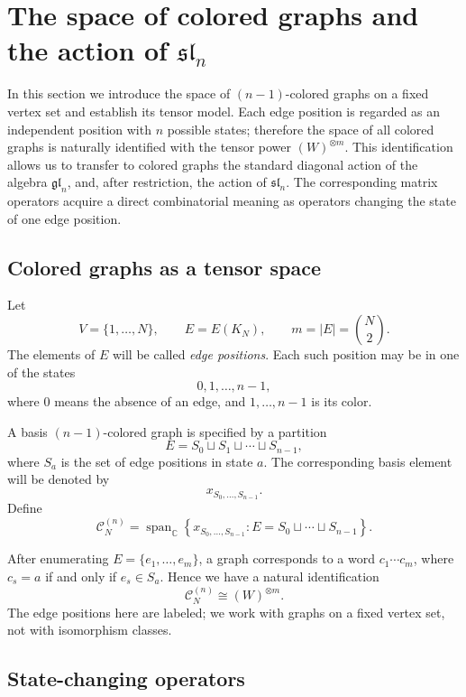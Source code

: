 \documentclass[12pt,reqno]{amsart}
\newcommand{\Span}{\operatorname{span}}
\begin{document}
\section{The space of colored graphs and the action of $\mathfrak{sl}_n$}
\label{colored_graphs}

In this section we introduce the space of $(n-1)$-colored graphs on a
fixed vertex set and establish its tensor model. Each edge position is
regarded as an independent position with $n$ possible states; therefore
the space of all colored graphs is naturally identified with the tensor
power $(W)^{\otimes m}$. This identification allows us to transfer to
colored graphs the standard diagonal action of the algebra
$\mathfrak{gl}_n$, and, after restriction, the action of
$\mathfrak{sl}_n$. The corresponding matrix operators acquire a direct
combinatorial meaning as operators changing the state of one edge
position.

\subsection{Colored graphs as a tensor space}

Let
$$
V=\{1,\dots,N\},
\qquad
E=E(K_N),
\qquad
m=|E|=\binom N2.
$$
The elements of $E$ will be called \emph{edge positions}. Each such
position may be in one of the states
$$
0,1,\dots,n-1,
$$
where $0$ means the absence of an edge, and $1,\dots,n-1$ is its color.

A basis $(n-1)$-colored graph is specified by a partition
$$
E=S_0\sqcup S_1\sqcup\cdots\sqcup S_{n-1},
$$
where $S_a$ is the set of edge positions in state $a$. The corresponding
basis element will be denoted by
$$
x_{S_0,\dots,S_{n-1}}.
$$
Define
$$
\mathcal C_N^{(n)}
=
\Span_{\mathbb C}
\left\{
 x_{S_0,\dots,S_{n-1}}:
 E=S_0\sqcup\cdots\sqcup S_{n-1}
\right\}.
$$

After enumerating $E=\{e_1,\dots,e_m\}$, a graph corresponds to a word
$c_1\cdots c_m$, where $c_s=a$ if and only if $e_s\in S_a$. Hence we have
a natural identification
\begin{equation}\label{graph_tensor_identification}
\mathcal C_N^{(n)}\cong(W)^{\otimes m}.
\end{equation}
The edge positions here are labeled; we work with graphs on a fixed vertex
set, not with isomorphism classes.

\subsection{State-changing operators}
\end{document}
